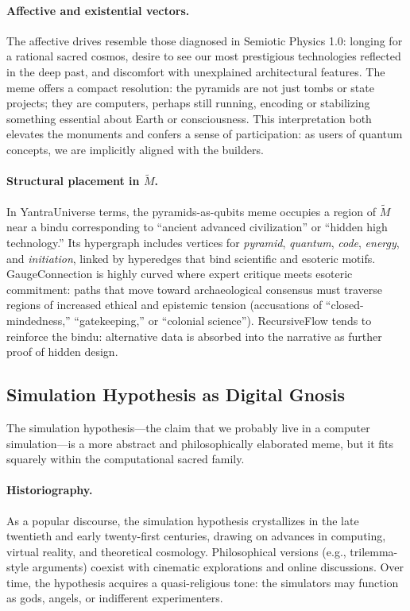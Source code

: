\documentclass[12]{amsart}
\theoremstyle{plain}
\begin{document}
\paragraph{Affective and existential vectors.} The affective drives resemble those diagnosed in Semiotic Physics 1.0: longing for a rational sacred cosmos, desire to see our most prestigious technologies reflected in the deep past, and discomfort with unexplained architectural features. The meme offers a compact resolution: the pyramids are not just tombs or state projects; they are computers, perhaps still running, encoding or stabilizing something essential about Earth or consciousness. This interpretation both elevates the monuments and confers a sense of participation: as users of quantum concepts, we are implicitly aligned with the builders.

\paragraph{Structural placement in $\tilde M$.} In YantraUniverse terms, the pyramids-as-qubits meme occupies a region of $\tilde M$ near a bindu corresponding to ``ancient advanced civilization'' or ``hidden high technology.'' Its hypergraph includes vertices for \emph{pyramid}, \emph{quantum}, \emph{code}, \emph{energy}, and \emph{initiation}, linked by hyperedges that bind scientific and esoteric motifs. GaugeConnection is highly curved where expert critique meets esoteric commitment: paths that move toward archaeological consensus must traverse regions of increased ethical and epistemic tension (accusations of ``closed-mindedness,'' ``gatekeeping,'' or ``colonial science''). RecursiveFlow tends to reinforce the bindu: alternative data is absorbed into the narrative as further proof of hidden design.

\subsection{Simulation Hypothesis as Digital Gnosis}

The simulation hypothesis---the claim that we probably live in a computer simulation---is a more abstract and philosophically elaborated meme, but it fits squarely within the computational sacred family.

\paragraph{Historiography.} As a popular discourse, the simulation hypothesis crystallizes in the late twentieth and early twenty-first centuries, drawing on advances in computing, virtual reality, and theoretical cosmology. Philosophical versions (e.g., trilemma-style arguments) coexist with cinematic explorations and online discussions. Over time, the hypothesis acquires a quasi-religious tone: the simulators may function as gods, angels, or indifferent experimenters.
\end{document}
